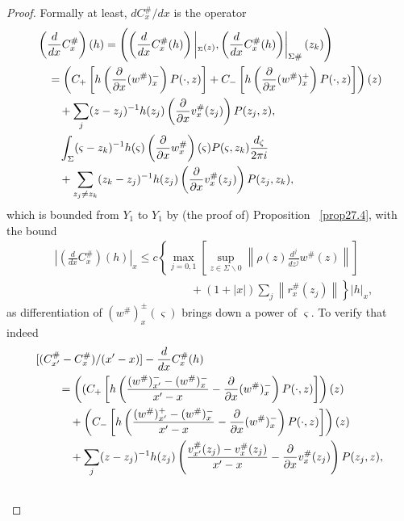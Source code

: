 \documentclass{surv-l}
\theoremstyle{plain}
\theoremstyle{definition}
\numberwithin{equation}{chapter}
\begin{document}
\begin{proof} Formally at least, $dC_{x}^{\#}/dx$ is the operator
\begin{align}\label{eq28.22}
&\left(\frac{d}{dx}C_{x}^{\#}\right)(h)=\left(\left(\frac{d}{dx}C_{x}^{\#}(h)\right)\left|_{_\Sigma(z)}, \left( \frac{d}{dx}C_{x}^{\#}(h)\right)\right|_{\Sigma\#}(z_{k})\right)\\ \nonumber
&\quad=\left(C_{+}\left[h\left(\frac{\partial}{\partial x}(w^{\#})_{x}^{-}\right)P(\cdot, z)\right]+C_{-}\left[h\left(\frac{\partial}{\partial x}(w^{\#})_{x}^{+}\right)P(\cdot, z)\right]\right)(z)\\ \notag
&\quad\quad+\sum_{j} (z -z_{j})^{-1}h(z_{j})\left(\frac{\partial}{\partial x}v_{x}^{\#}(z_{j})\right)P(z_{j}, z),\\ \notag
&\quad\quad\int_{\Sigma}(\varsigma-z_{k})^{-1}h(\varsigma)\left(\frac{\partial}{\partial x}w_{x}^{\#}\right)(\varsigma)P(\varsigma, z_{k})\frac{d_{\zeta}}{2\pi i}\\ \notag
&\quad\quad+\sum_{z_{j}\neq z_{k}}(z_{k}-z_{j})^{-1}h(z_{j})\left(\frac{\partial}{\partial x}v_{x}^{\#}(z_{j})\right)P(z_{j}, z_{k}),
\end{align}
which is bounded from $Y_{1}$ to $Y_{1}$ by (the proof of) Proposition ~\ref{prop27.4}, with the bound
\begin{align}\label{eq28.23}
&\left|\left( \frac{d}{dx}C_{x}^{\#}\right)(h)\right|_{x}\leq c\left\{\max_{j=0,1}\left[\sup_{z\in\Sigma\backslash 0}\left\|\rho(z)\frac{d^{j}}{d{z^{j}}}w^{\#}(z)\right\|\right]\right.\\
&\qquad\qquad\qquad\qquad\qquad\qquad+\left.(1+|x|)\sum_{j}\left\| r_{x}^{\#}(z_{j})\right\|\right\} |h|_{x},\nonumber
\end{align}
as differentiation of $(w^{\#})_{x}^{\pm}(\varsigma)$ brings down a power of $\varsigma$. To verify that indeed
\begin{align}\label{eq28.24}
&[(C_{x'}^{\#}-C_{x}^{\#})/(x'-x)]- \frac{d}{dx}C_{x}^{\#}(h)\\ \nonumber
&\qquad=\left((C_{+}\left[h\left(\frac{(w^{\#})_{x'}^{-}-(w^{\#})_{x}^{-}}{x'-x}-\frac{\partial}{\partial x}(w^{\#})_{x}^{-}\right)P(\cdot,z)\right]\right)(z)\\ \notag
&\qquad\quad+\left(C_{-}\left[h\left(\frac{(w^{\#})_{x'}^{+}-(w^{\#})_{x}^{-}}{x'-x}-\frac{\partial}{\partial x}(w^{\#})_{x}^{-}\right)P(\cdot, z)\right]\right)(z)\\ \notag
&\qquad\quad+\sum_{j}(z-z_{j})^{-1}h(z_{j})\left(\frac{v_{x'}^{\#}(z_{j})-v_{x}^{\#}(z_{j})}{x'-x}-\frac{\partial}{\partial x}v_{x}^{\#}(z_{j})\right)P(z_{j}, z),\\ \notag

\end{align}
\end{proof}
\end{document}
